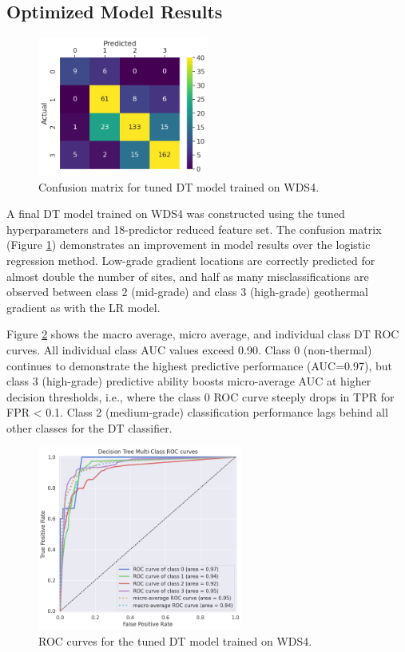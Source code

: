 \subsection{Optimized Model Results}
\begin{figure}[!htp]
\centering
\includegraphics[width=0.5\textwidth]{templates/images/Figure-DT-ConfusionMatrix.png}
\singlespacing
\caption[Decision tree confusion matrix]{Confusion matrix for tuned DT model trained on WDS4.}
\label{fig:dtree_conf_matrix}
\end{figure}

A final DT model trained on WDS4 was constructed using the tuned hyperparameters and 18-predictor reduced feature set. The confusion matrix (Figure \ref{fig:dtree_conf_matrix}) demonstrates an improvement in model results over the logistic regression method. Low-grade gradient locations are correctly predicted for almost double the number of sites, and half as many misclassifications are observed between class 2 (mid-grade) and class 3 (high-grade) geothermal gradient as with the LR model.

Figure \ref{fig:dtree_auc} shows the macro average, micro average, and individual class DT ROC curves. All individual class AUC values exceed 0.90. Class 0 (non-thermal) continues to demonstrate the highest predictive performance (AUC=0.97), but class 3 (high-grade) predictive ability boosts micro-average AUC at higher decision thresholds, i.e., where the class 0 ROC curve steeply drops in TPR for FPR < 0.1. Class 2 (medium-grade) classification performance lags behind all other classes for the DT classifier.

\begin{figure}[!htp]
\centering
\includegraphics[width=0.6\textwidth]{templates/images/Figure-DT_AUC.png}
\caption[Decision tree ROC curves]{ROC curves for the tuned DT model trained on WDS4.}
\label{fig:dtree_auc}
\end{figure}

